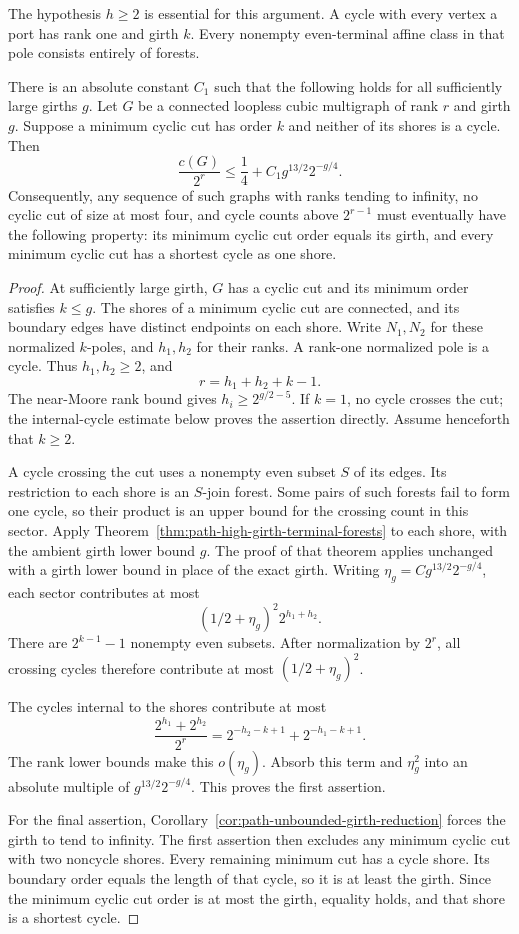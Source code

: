 The hypothesis $h\ge2$ is essential for this argument.
A cycle with every vertex a port has rank one and girth $k$.
Every nonempty even-terminal affine class in that pole consists entirely of forests.

\begin{corollary}
\label{cor:path-high-girth-noncycle-minimum-cut}
There is an absolute constant $C_1$ such that the following holds for all sufficiently large girths $g$.
Let $G$ be a connected loopless cubic multigraph of rank $r$ and girth $g$.
Suppose a minimum cyclic cut has order $k$ and neither of its shores is a cycle.
Then
\[
 \frac{c(G)}{2^r}
 \le\frac14+C_1 g^{13/2}2^{-g/4}.
\]
Consequently, any sequence of such graphs with ranks tending to infinity, no cyclic cut of size at most four, and cycle counts above $2^{r-1}$ must eventually have the following property:
its minimum cyclic cut order equals its girth, and every minimum cyclic cut has a shortest cycle as one shore.
\end{corollary}

\begin{proof}
At sufficiently large girth, $G$ has a cyclic cut and its minimum order satisfies $k\le g$.
The shores of a minimum cyclic cut are connected, and its boundary edges have distinct endpoints on each shore.
Write $N_1,N_2$ for these normalized $k$-poles, and $h_1,h_2$ for their ranks.
A rank-one normalized pole is a cycle.
Thus $h_1,h_2\ge2$, and
\[
 r=h_1+h_2+k-1.
\]
The near-Moore rank bound gives $h_i\ge2^{g/2-5}$.
If $k=1$, no cycle crosses the cut; the internal-cycle estimate below proves the assertion directly.
Assume henceforth that $k\ge2$.

A cycle crossing the cut uses a nonempty even subset $S$ of its edges.
Its restriction to each shore is an $S$-join forest.
Some pairs of such forests fail to form one cycle, so their product is an upper bound for the crossing count in this sector.
Apply Theorem~\ref{thm:path-high-girth-terminal-forests} to each shore, with the ambient girth lower bound $g$.
The proof of that theorem applies unchanged with a girth lower bound in place of the exact girth.
Writing $\eta_g=Cg^{13/2}2^{-g/4}$, each sector contributes at most
\[
 (1/2+\eta_g)^2 2^{h_1+h_2}.
\]
There are $2^{k-1}-1$ nonempty even subsets.
After normalization by $2^r$, all crossing cycles therefore contribute at most
$(1/2+\eta_g)^2$.

The cycles internal to the shores contribute at most
\[
 \frac{2^{h_1}+2^{h_2}}{2^r}
 =2^{-h_2-k+1}+2^{-h_1-k+1}.
\]
The rank lower bounds make this $o(\eta_g)$.
Absorb this term and $\eta_g^2$ into an absolute multiple of $g^{13/2}2^{-g/4}$.
This proves the first assertion.

For the final assertion, Corollary~\ref{cor:path-unbounded-girth-reduction} forces the girth to tend to infinity.
The first assertion then excludes any minimum cyclic cut with two noncycle shores.
Every remaining minimum cut has a cycle shore.
Its boundary order equals the length of that cycle, so it is at least the girth.
Since the minimum cyclic cut order is at most the girth, equality holds, and that shore is a shortest cycle.
\end{proof}
